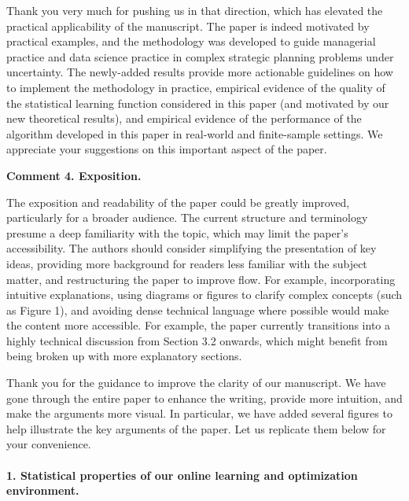 \documentclass[11pt]{article}
\begin{document}
Thank you very much for pushing us in that direction, which has elevated the practical applicability of the manuscript. The paper is indeed motivated by practical examples, and the methodology was developed to guide managerial practice and data science practice in complex strategic planning problems under uncertainty. The newly-added results provide more actionable guidelines on how to implement the methodology in practice, empirical evidence of the quality of the statistical learning function considered in this paper (and motivated by our new theoretical results), and empirical evidence of the performance of the algorithm developed in this paper in real-world and finite-sample settings. We appreciate your suggestions on this important aspect of the paper.

\begin{commentBox}
    \textbf{Comment 4. Exposition.}\label{R3:4}

    The exposition and readability of the paper could be greatly improved, particularly for a broader audience. The current structure and terminology presume a deep familiarity with the topic, which may limit the paper’s accessibility. The authors should consider simplifying the presentation of key ideas, providing more background for readers less familiar with the subject matter, and restructuring the paper to improve flow. For example, incorporating intuitive explanations, using diagrams or figures to clarify complex concepts (such as Figure 1), and avoiding dense technical language where possible would make the content more accessible. For example, the paper currently transitions into a highly technical discussion from Section 3.2 onwards, which might benefit from being broken up with more explanatory sections.
\end{commentBox}

Thank you for the guidance to improve the clarity of our manuscript. We have gone through the entire paper to enhance the writing, provide more intuition, and make the arguments more visual. In particular, we have added several figures to help illustrate the key arguments of the paper. Let us replicate them below for your convenience.

\paragraph{1. Statistical properties of our online learning and optimization environment.}\
\end{document}
